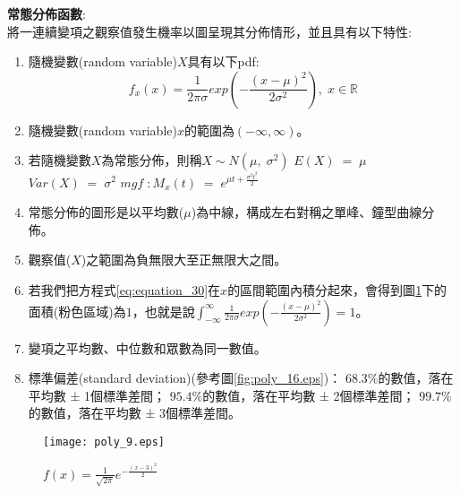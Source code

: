 \documentclass[12pt, a4paper]{article}
\begin{document}
\textbf{常態分佈函數}\;:\\
將一連續變項之觀察值發生機率以圖呈現其分佈情形，並且具有以下特性:
\begin{enumerate}
\item 隨機變數(random variable)\;$X$\;具有以下pdf\;:
\begin{equation}
f_x(x) = \frac{1}{2\pi \sigma} exp(-\frac{(x-\mu)^2}{2\sigma ^2}),\; x \in \mathbb{R}
\end{equation}
\item 隨機變數(random variable)\;$x$\;的範圍為\;$(-\infty, \infty)$\;。
\item 若隨機變數\;$X$\;為常態分佈，則稱\;$X\sim N(\mu,\;\sigma ^2)$\;
\subitem $E(X)\;=\;\mu$
\subitem $Var(X)\;=\;\sigma ^2$
\subitem $mgf\;:M_x(t)\;=\;e^{\mu t+\frac{\sigma ^2 t^2}{2}}$
\item 常態分佈的圖形是以平均數(\;$\mu$\;)為中線，構成左右對稱之單峰、鐘型曲線分佈。
\item 觀察值(\;$X$\;)之範圍為負無限大至正無限大之間。
\item 若我們把方程式\;\ref{eq:equation_30}\;在\;$x$\;的區間範圍內積分起來，會得到圖\;\ref{fig:poly_9.eps}\;下的面積(粉色區域)為\;$1$\;，也就是說\;$\int_{-\infty}^{\infty} \frac{1}{2\pi \sigma} exp(-\frac{(x-\mu)^2}{2\sigma ^2})=1$\;。
\item 變項之平均數、中位數和眾數為同一數值。
\item 標準偏差(standard deviation)(參考圖\;\ref{fig:poly_16.eps})：
\subitem $68.3\%$\;的數值，落在平均數 ± 1個標準差間；
\subitem $95.4\%$\;的數值，落在平均數 ± 2個標準差間；
\subitem $99.7\%$\;的數值，落在平均數 ± 3個標準差間。\\
\end{enumerate}

\begin{figure}[h]
\centering
\texttt{[image: poly\_9.eps]}
\caption{$f(x) = \frac{1}{\sqrt{2\pi}}e^{-\frac{(x-3)^2}{2}}$}
\label{fig:poly_9.eps}
\end{figure}
\end{document}
